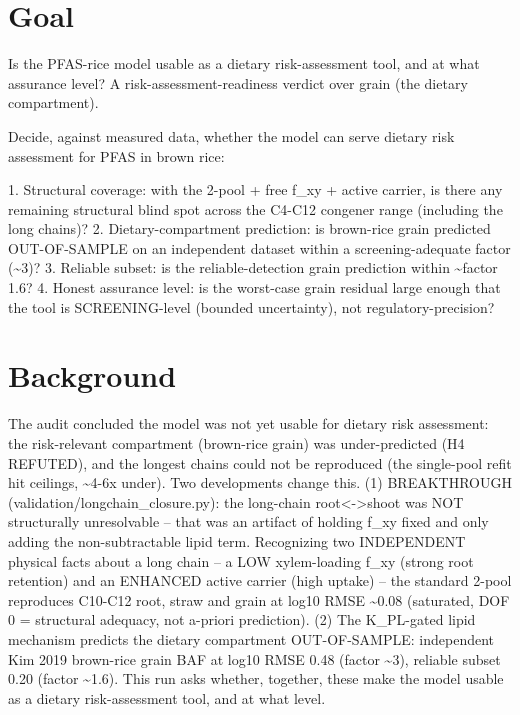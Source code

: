 \documentclass{article}
\begin{document}
\section{Goal}
Is the PFAS-rice model usable as a dietary risk-assessment tool, and at what assurance level? A risk-assessment-readiness verdict over grain (the dietary compartment).

Decide, against measured data, whether the model can serve dietary risk assessment
for PFAS in brown rice:

1. Structural coverage: with the 2-pool + free f\_xy + active carrier, is there any
   remaining structural blind spot across the C4-C12 congener range (including the
   long chains)?
2. Dietary-compartment prediction: is brown-rice grain predicted OUT-OF-SAMPLE on an
   independent dataset within a screening-adequate factor (\textasciitilde{}3)?
3. Reliable subset: is the reliable-detection grain prediction within \textasciitilde{}factor 1.6?
4. Honest assurance level: is the worst-case grain residual large enough that the
   tool is SCREENING-level (bounded uncertainty), not regulatory-precision?

\section{Background}
The audit concluded the model was not yet usable for dietary risk assessment: the
risk-relevant compartment (brown-rice grain) was under-predicted (H4 REFUTED), and
the longest chains could not be reproduced (the single-pool refit hit ceilings,
\textasciitilde{}4-6x under). Two developments change this. (1) BREAKTHROUGH
(validation/longchain\_closure.py): the long-chain root<->shoot was NOT structurally
unresolvable -- that was an artifact of holding f\_xy fixed and only adding the
non-subtractable lipid term. Recognizing two INDEPENDENT physical facts about a
long chain -- a LOW xylem-loading f\_xy (strong root retention) and an ENHANCED
active carrier (high uptake) -- the standard 2-pool reproduces C10-C12 root, straw
and grain at log10 RMSE \textasciitilde{}0.08 (saturated, DOF 0 = structural adequacy, not a-priori
prediction). (2) The K\_PL-gated lipid mechanism predicts the dietary compartment
OUT-OF-SAMPLE: independent Kim 2019 brown-rice grain BAF at log10 RMSE 0.48 (factor
\textasciitilde{}3), reliable subset 0.20 (factor \textasciitilde{}1.6). This run asks whether, together, these make
the model usable as a dietary risk-assessment tool, and at what level.
\end{document}

